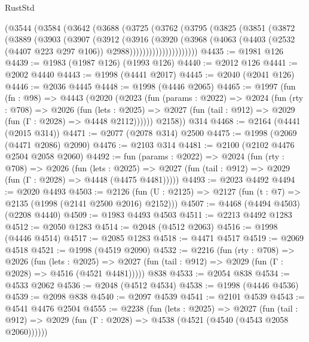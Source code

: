 \begin{lexlean}{RustStd}
\begin{coremodule}
        (@3544
          (@3584
            (@3642
              (@3688
                (@3725
                  (@3762
                    (@3795
                      (@3825
                        (@3851
                          (@3872
                            (@3889
                              (@3903
                                (@3907
                                  (@3912
                                    (@3916
                                      (@3920
                                        (@3968
                                          (@4063
                                            (@4403
                                              (@2532 (@4407 @223 @297 @106))
                                              @2988)))))))))))))))))))))
@4435 := @1981 @126
@4439 := @1983 (@1987 @126) (@1993 @126)
@4440 := @2012 @126
@4441 := @2002 @4440
@4443 := @1998 (@4441 @2017)
@4445 := @2040 (@2041 @126)
@4446 := @2036 @4445
@4448 := @1998 (@4446 @2065)
@4465 := @1997
    (fun (fn : @98) =>
    @4443
      (@2020
        (@2023
          (fun (params : @2022) =>
          @2024
            (fun (rty : @708) =>
            @2026
              (fun (lets : @2025) =>
              @2027 (fun (tail : @912) => @2029 (fun (Γ : @2028) => @4448 @2112))))))
        @2158))
    @314
@4468 := @2164 (@4441 (@2015 @314))
@4471 := @2077 (@2078 @314) @2500
@4475 := @1998 (@2069 (@4471 @2086) @2090)
@4476 := @2103 @314
@4481 := @2100 (@2102 @4476 @2504 @2058 @2060)
@4492 := fun (params : @2022) =>
  @2024
    (fun (rty : @708) =>
    @2026
      (fun (lets : @2025) =>
      @2027 (fun (tail : @912) => @2029 (fun (Γ : @2028) => @4448 (@4475 @4481)))))
@4493 := @2023 @4492
@4494 := @2020 @4493
@4503 := @2126 (fun (U : @2125) => @2127 (fun (t : @7) => @2135 (@1998 (@2141 @2500 @2016) @2152)))
@4507 := @4468 (@4494 @4503) (@2208 @4440)
@4509 := @1983 @4493 @4503
@4511 := @2213 @4492 @1283
@4512 := @2050 @1283
@4514 := @2048 (@4512 @2063)
@4516 := @1998 (@4446 @4514)
@4517 := @2085 @1283
@4518 := @4471 @4517
@4519 := @2069 @4518
@4521 := @1998 (@4519 @2090)
@4532 := @2216
    (fun (rty : @708) =>
    @2026
      (fun (lets : @2025) =>
      @2027 (fun (tail : @912) => @2029 (fun (Γ : @2028) => @4516 (@4521 @4481)))))
    @838
@4533 := @2054 @838
@4534 := @4533 @2062
@4536 := @2048 (@4512 @4534)
@4538 := @1998 (@4446 @4536)
@4539 := @2098 @838
@4540 := @2097 @4539
@4541 := @2101 @4539
@4543 := @4541 @4476 @2504
@4555 := @2238
    (fun (lets : @2025) =>
    @2027
      (fun (tail : @912) => @2029 (fun (Γ : @2028) => @4538 (@4521 (@4540 (@4543 @2058 @2060))))))

\end{coremodule}
\end{lexlean}
